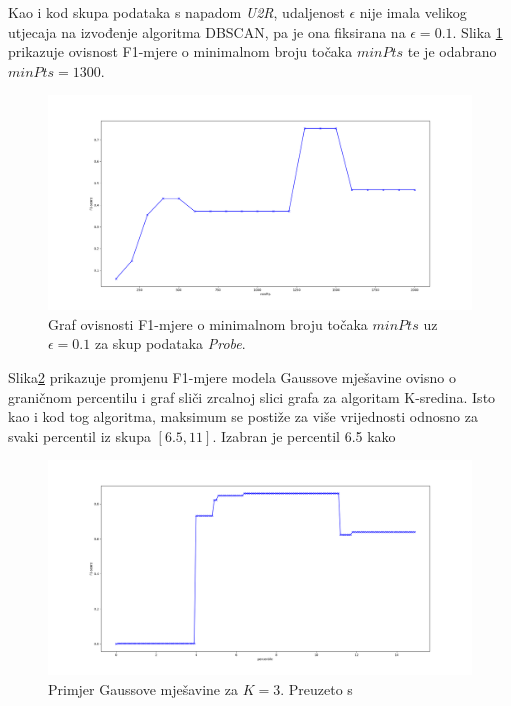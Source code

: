 \documentclass[utf8, diplomski, numeric]{fer}
\begin{document}
Kao i kod skupa podataka s napadom \textit{U2R}, udaljenost $\epsilon$ nije imala velikog utjecaja na izvođenje algoritma DBSCAN, pa je ona fiksirana na $\epsilon = 0.1$. Slika \ref{fig:probe-dbscan} prikazuje ovisnost F1-mjere o minimalnom broju točaka $minPts$ te je odabrano $minPts = 1300$.

\begin{figure}[htb]
\includegraphics[width=1\textwidth]{images/probe-dbscan-f1.png}
\centering
\caption{Graf ovisnosti F1-mjere o minimalnom broju točaka $minPts$ uz $\epsilon = 0.1$ za skup podataka \textit{Probe}.}
\label{fig:probe-dbscan}
\end{figure}

Slika\ref{fig:probe-gauss} prikazuje promjenu F1-mjere modela Gaussove mješavine ovisno o graničnom percentilu i graf sliči zrcalnoj slici grafa za algoritam K-sredina. Isto kao i kod tog algoritma, maksimum se postiže za više vrijednosti odnosno za svaki percentil iz skupa $[6.5, 11]$. Izabran je percentil 6.5 kako 

\begin{figure}[htb]
\includegraphics[width=1\textwidth]{images/probe-gauss-f1.png}
\centering
\caption{Primjer Gaussove mješavine za $K = 3$. Preuzeto s  \cite{GaussianMixtureExplained}}
\label{fig:probe-gauss}
\end{figure}
\end{document}
